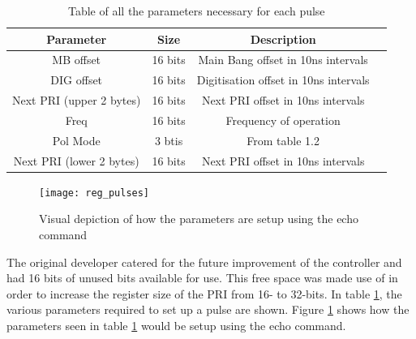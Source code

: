 \documentclass[12pt, a4paper]{article}
\begin{document}
\begin{table}
\centering
\begin{tabular}{ |c|c|c|c| } 
 \hline
 Parameter & Size &  Description \\ 
 
 \hline 
 MB offset & 16 bits & Main Bang offset in 10ns intervals \\ 
 
 \hline
 DIG offset & 16 bits & Digitisation offset in 10ns intervals \\
 
 \hline
 Next PRI (upper 2 bytes) & 16 bits & Next PRI offset in 10ns intervals \\
 
 \hline
 Freq & 16 bits & Frequency of operation \\
 
 \hline
 Pol Mode & 3 btis & From table 1.2 \\
 
 \hline
 Next PRI (lower 2 bytes) & 16 bits & Next PRI offset in 10ns intervals\\
 \hline 
\end{tabular}
\caption{Table of all the parameters necessary for each pulse}
\label{table:1}
\end{table}

	\begin{figure}
		\centering
		\texttt{[image: reg\_pulses]}
		\caption{Visual depiction of how the parameters are setup using the echo command}
		\label{fig:reg_pulses}
	\end{figure}


\begin{flushleft}
The original developer catered for the future improvement of the controller and had 16 bits of unused bits available for use. This free space was made use of in order to increase the register size of the PRI from 16- to 32-bits. In table \ref{table:1}, the various parameters required to set up a pulse are shown. Figure \ref{fig:reg_pulses} shows how the parameters seen in table \ref{table:1} would be setup using the echo command.
\end{flushleft}
\end{document}
